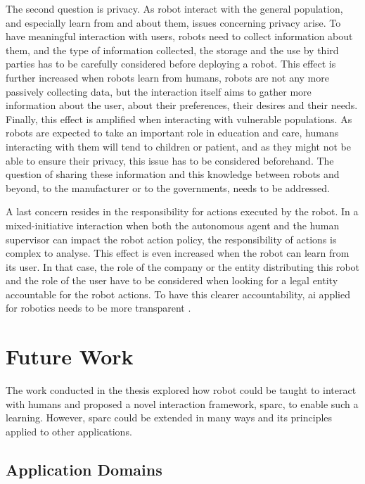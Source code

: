 The second question is privacy. As robot interact with the general population, and especially learn from and about them, issues concerning privacy arise. To have meaningful interaction with users, robots need to collect information about them, and the type of information collected, the storage and the use by third parties has to be carefully considered before deploying a robot. This effect is further increased when robots learn from humans, robots are not any more passively collecting data, but the interaction itself aims to gather more information about the user, about their preferences, their desires and their needs. Finally, this effect is amplified when interacting with vulnerable populations. As robots are expected to take an important role in education and care, humans interacting with them will tend to children or patient, and as they might not be able to ensure their privacy, this issue has to be considered beforehand. The question of sharing these information and this knowledge between robots and beyond, to the manufacturer or to the governments, needs to be addressed.

A last concern resides in the responsibility for actions executed by the robot. In a mixed-initiative interaction when both the autonomous agent and the human supervisor can impact the robot action policy, the responsibility of actions is complex to analyse. This effect is even increased when the robot can learn from its user. In that case, the role of the company or the entity distributing this robot and the role of the user have to be considered when looking for a legal entity accountable for the robot actions. To have this clearer accountability, \gls{ai} applied for robotics needs to be more transparent \citep{wachter2017transparent}.

\section{Future Work}

The work conducted in the thesis explored how robot could be taught to interact with humans and proposed a novel interaction framework, \gls{sparc}, to enable such a learning. However, \gls{sparc} could be extended in many ways and its principles applied to other applications.

\subsection{Application Domains}

